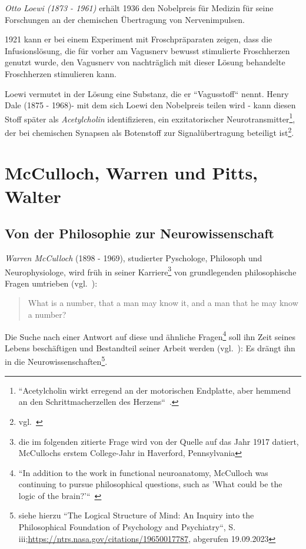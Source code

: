 \textit{Otto Loewi (1873 - 1961)} erhält 1936 den Nobelpreis für Medizin für seine Forschungen an der chemischen Übertragung von Nervenimpulsen.

1921 kann er bei einem Experiment mit Froschpräparaten zeigen, dass die Infusionslösung, die für vorher am Vagusnerv bewusst stimulierte Froschherzen genutzt wurde, den Vagusnerv von nachträglich mit dieser Lösung behandelte Froschherzen stimulieren kann.

Loewi vermutet in der Lösung eine Substanz, die er ``Vagusstoff`` nennt.
Henry Dale (1875 - 1968)- mit dem sich Loewi den Nobelpreis teilen wird - kann diesen Stoff später als \textit{Acetylcholin} identifizieren, ein exzitatorischer Neurotransmitter\footnote{
    ``Acetylcholin wirkt erregend an der motorischen Endplatte, aber hemmend an den Schrittmacherzellen des Herzens``~\cite[105]{HS19b}.
}, der bei chemischen Synapsen als Botenstoff zur Signalübertragung beteiligt ist\footnote{
    vgl.~\cite[119, Exkurs 5.1]{BCP18}
}.



\section{McCulloch, Warren und Pitts, Walter}\label{appendix:mcculloch}
\subsection*{Von der Philosophie zur Neurowissenschaft}

\textit{Warren McCulloch} (1898 - 1969), studierter Pyschologe, Philosoph und Neurophysiologe, wird früh in seiner Karriere\footnote{
    die im folgenden zitierte Frage wird von der Quelle auf das Jahr 1917 datiert, McCullochs erstem College-Jahr in Haverford, Pennsylvania
} von grundlegenden philosophische Fragen umtrieben (vgl.~\cite[1]{Arb19}):

\blockquote[{\cite[2]{Mcc16}}]{
    What is a number, that a man may know it, and a man that he may know a number{?}
}

\noindent
Die Suche nach einer Antwort auf diese und ähnliche Fragen\footnote{
    ``In addition to the work in functional neuroanatomy, McCulloch was continuing to pursue philosophical questions, such as 'What could be the logic of the brain?'``~\cite[3]{Arb19}
} soll ihn Zeit seines Lebens beschäftigen und Bestandteil seiner Arbeit werden (vgl.~\cite[4 f.]{Abr02}): Es drängt ihn in die Neurowissenschaften\footnote{
siehe hierzu ``The Logical Structure of Mind: An Inquiry into the Philosophical Foundation of Psychology and Psychiatry``, S. iii;\url{https://ntrs.nasa.gov/citations/19650017787}, abgerufen 19.09.2023
}.

